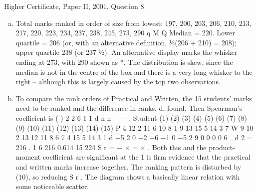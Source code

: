 \documentclass[a4paper,12pt]{article}
\begin{document}
Higher Certificate, Paper II, 2001. Question 8
\begin{enumerate}[(a)]
\item  Total marks ranked in order of size from lowest:
197, 200, 203, 206, 210, 213, 217, 220, 223, 234, 237, 238, 245, 273, 290
q M Q
Median = 220. Lower quartile = 206 (or, with an alternative definition, ½(206 + 210)
= 208); upper quartile 238 (or 237 ½).
An alternative display marks the whisker ending at 273, with 290 shown as *. The
distribution is skew, since the median is not in the centre of the box and there is a very
long whisker to the right – although this is largely caused by the top two observations.
\item To compare the rank orders of Practical and Written, the 15 students' marks
need to be ranked and the difference in ranks, d, found. Then Spearman's coefficient
is ( )
2
2
6
1
1
d
n n
−
−
\sigma .
Student (1) (2) (3) (4) (5) (6) (7) (8) (9) (10) (11) (12) (13) (14) (15)
P 4 12 2 11 6 10 8 1 9 13 15 5 14 3 7
W 9 10 2 13 12 11 8 6 7 4 15 5 14 3 1
d −5 2 0 −2 −6 −1 0 −5 2 9 0 0 0 0 6
\sigma_d 2 = 216 . 1 6 216 0.614
15 224 S r = − × =
×
.
Both this and the product-moment coefficient are significant at the 1%
is firm evidence that the practical and written marks increase together. The ranking
pattern is disturbed by (10), so reducing S r . The diagram shows a basically linear
relation with some noticeable scatter.


\end{enumerate}
\end{document}
